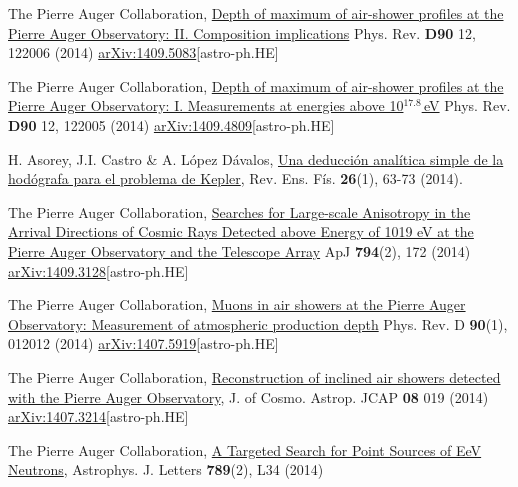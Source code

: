 \begin{etaremune}
\item {}The Pierre Auger Collaboration, \href{http://dx.doi.org/10.1103/PhysRevD.90.122006}{{Depth of maximum of air-shower profiles at the Pierre Auger Observatory: II. Composition implications}} Phys. Rev. {\bf{D90}} 12, 122006 (2014) \href{http://arxiv.org/abs/1409.5083}{arXiv:1409.5083}[astro-ph.HE]

\item {}The Pierre Auger Collaboration, \href{http://dx.doi.org/10.1103/PhysRevD.90.122005}{{Depth of maximum of air-shower profiles at the Pierre Auger Observatory: I. Measurements at energies above 10$^{17.8}$\,eV}} Phys. Rev. {\bf{D90}} 12, 122005 (2014) \href{http://arxiv.org/abs/1409.4809}{arXiv:1409.4809}[astro-ph.HE]

\item {}H. Asorey, J.I. Castro \& A. López Dávalos, \href{http://www.revistas.unc.edu.ar/index.php/revistaEF/article/view/9512}{{Una deducción analítica simple de la hodógrafa para el problema de Kepler}}, Rev. Ens. Fís. {\bf{26}}(1), 63-73 (2014).

\item {}The Pierre Auger Collaboration, \href{http://dx.doi.org/10.1088/0004-637X/794/2/172}{{Searches for Large-scale Anisotropy in the Arrival Directions of Cosmic Rays Detected above Energy of 1019 eV at the Pierre Auger Observatory and the Telescope Array}} ApJ {\bf{794}}(2), 172 (2014) \href{http://arxiv.org/abs/1409.3128}{arXiv:1409.3128}[astro-ph.HE]

\item {}The Pierre Auger Collaboration, \href{http://journals.aps.org/prd/abstract/10.1103/PhysRevD.90.012012}{{Muons in air showers at the Pierre Auger Observatory: Measurement of atmospheric production depth}} Phys. Rev. D {\bf{90}}(1), 012012 (2014) \href{http://arxiv.org/abs/1407.5919}{arXiv:1407.5919}[astro-ph.HE]

\item {}The Pierre Auger Collaboration, \href{http://dx.doi.org/10.1088/1475-7516/2014/08/019}{{Reconstruction of inclined air showers detected with the Pierre Auger Observatory}}, J. of Cosmo. Astrop. JCAP {\bf{08}} 019 (2014) \href{http://arxiv.org/abs/1407.3214}{arXiv:1407.3214}[astro-ph.HE]
  
\item {}The Pierre Auger Collaboration, \href{http://iopscience.iop.org/2041-8205/789/2/L34}{{A Targeted Search for Point Sources of EeV Neutrons}}, Astrophys. J. Letters {\bf{789}}(2), L34 (2014)


\end{etaremune}
